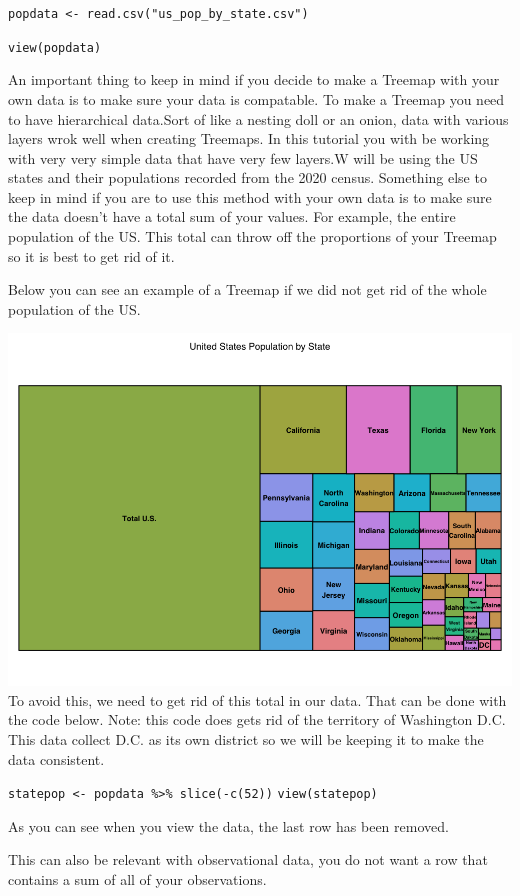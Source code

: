 \documentclass[
]{article}
\begin{document}
\texttt{popdata\ \textless{}-\ read.csv("us\_pop\_by\_state.csv")}

\texttt{view(popdata)}

An important thing to keep in mind if you decide to make a Treemap with
your own data is to make sure your data is compatable. To make a Treemap
you need to have hierarchical data.Sort of like a nesting doll or an
onion, data with various layers wrok well when creating Treemaps. In
this tutorial you with be working with very very simple data that have
very few layers.W will be using the US states and their populations
recorded from the 2020 census. Something else to keep in mind if you are
to use this method with your own data is to make sure the data doesn't
have a total sum of your values. For example, the entire population of
the US. This total can throw off the proportions of your Treemap so it
is best to get rid of it.

Below you can see an example of a Treemap if we did not get rid of the
whole population of the US.

\includegraphics{wholepopplot.png} To avoid this, we need to get rid of
this total in our data. That can be done with the code below. Note: this
code does gets rid of the territory of Washington D.C. This data collect
D.C. as its own district so we will be keeping it to make the data
consistent.

\texttt{statepop\ \textless{}-\ popdata\ \%\textgreater{}\%\ slice(-c(52))}
\texttt{view(statepop)}

As you can see when you view the data, the last row has been removed.

This can also be relevant with observational data, you do not want a row
that contains a sum of all of your observations.
\end{document}
